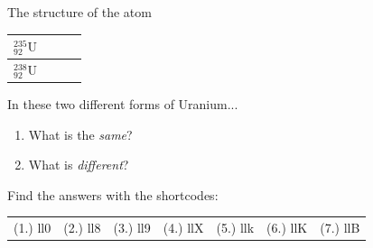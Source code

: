 \begin{exercises}{The structure of the atom}
\begin{enumerate}[noitemsep, label=\textbf{\arabic*}. ]
\begin{table}[H]
\begin{center}
\begin{tabular}{|l|l|l|l|}
        $_{92}^{235}\text{U}$ &
         &
         &
        \\ \hline
        $_{92}^{238}\text{U}$ &
         &
         &
     \\ \hline
    \end{tabular}
      \end{center}
\end{table}
    \par
In these two different forms of Uranium...
\label{m38745*id257277}\begin{enumerate}[noitemsep, label=\textbf{\alph*}. ] 
            \label{m38745*uid38}\item What is the \textsl{same}?
\label{m38745*uid39}\item What is \textsl{different}?
\end{enumerate}
\end{enumerate}
  \label{m38745**end}
\par {} Find the answers with the shortcodes:
 \par \begin{tabular}[h]{cccccc}
 (1.) ll0  &  (2.) ll8  &  (3.) ll9  &  (4.) llX  &  (5.) llk  &  (6.) llK  &  (7.) llB  & \end{tabular}
\end{exercises}
